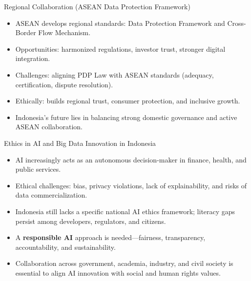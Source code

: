 \documentclass[aspectratio=169, table]{beamer}
\begin{document}
\begin{frame}{Regional Collaboration (ASEAN Data Protection Framework)}
	\vspace{20pt}
	\begin{itemize}
		\item ASEAN develops regional standards: Data Protection Framework and Cross-Border Flow Mechanism.  
		\item Opportunities: harmonized regulations, investor trust, stronger digital integration.  
		\item Challenges: aligning PDP Law with ASEAN standards (adequacy, certification, dispute resolution).  
		\item Ethically: builds regional trust, consumer protection, and inclusive growth.  
		\item Indonesia’s future lies in balancing strong domestic governance and active ASEAN collaboration.  
	\end{itemize}
\end{frame}

\begin{frame}{Ethics in AI and Big Data Innovation in Indonesia}
	\vspace{20pt}
	\begin{itemize}
		\item AI increasingly acts as an autonomous decision-maker in finance, health, and public services.  
		\item Ethical challenges: bias, privacy violations, lack of explainability, and risks of data commercialization.  
		\item Indonesia still lacks a specific national AI ethics framework; literacy gaps persist among developers, regulators, and citizens.  
		\item A \textbf{responsible AI} approach is needed—fairness, transparency, accountability, and sustainability.  
		\item Collaboration across government, academia, industry, and civil society is essential to align AI innovation with social and human rights values.  
	\end{itemize}
\end{frame}
\end{document}
